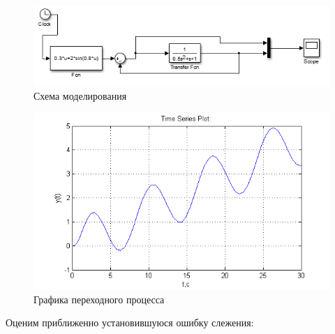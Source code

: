 \documentclass[a4paper, 12pt]{article}
\begin{document}
\begin{center}
	\begin{figure}[h]
		\centering
	\includegraphics[width=0.95\linewidth]{14}
		\caption{Схема моделирования}
		\label{fig:14}
	\end{figure}
\end{center}

\begin{figure}[h]
	\centering
	\includegraphics[width=0.95\linewidth]{15}
	\caption{Графика переходного процесса}
	\label{fig:15}
\end{figure}

Оценим приближенно установившуюся ошибку слежения:
\end{document}
